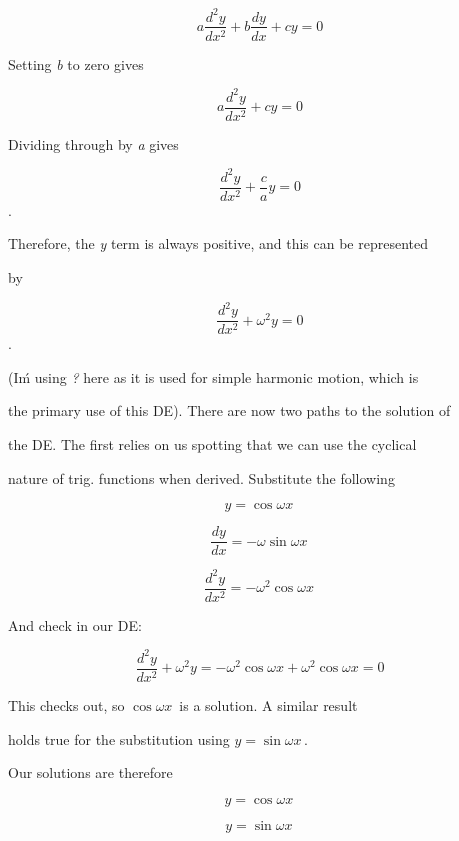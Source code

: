 $$a\frac{d^2y}{dx^2}+b\frac{dy}{dx}+cy=0$$



Setting \textit{b} to zero gives



$$a\frac{d^2y}{dx^2}+cy=0$$



Dividing through by \textit{a} gives



$$\frac{d^2y}{dx^2}+\frac{c}{a}y=0$$.



Therefore, the \textit{y} term is always positive, and this can be represented

by



$$\frac{d^2y}{dx^2}+\omega^2y=0$$.



(I\'m using \textit{?} here as it is used for simple harmonic motion, which is

the primary use of this DE). There are now two paths to the solution of

the DE. The first relies on us spotting that we can use the cyclical

nature of trig. functions when derived. Substitute the following



$$y=\cos \omega x \,$$



$$\frac{dy}{dx}=-\omega \sin \omega x\,$$



$$\frac{d^2y}{dx^2}=-\omega^2 \cos \omega x\,$$



And check in our DE:



$$\frac{d^2y}{dx^2}+\omega^2 y=-\omega^2 \cos \omega x+\omega^2 \cos \omega x=0$$



This checks out, so $\cos \omega x\,$ is a solution. A similar result

holds true for the substitution using $y=\sin \omega x \,$.



Our solutions are therefore



$$y=\cos \omega x \,$$



$$y=\sin \omega x \,$$



